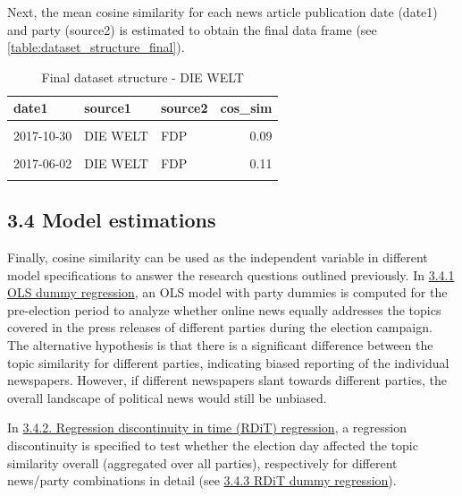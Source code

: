 \documentclass[
  12pt,
]{article}
\begin{document}
Next, the mean cosine similarity for each news article publication date
(date1) and party (source2) is estimated to obtain the final data frame
(see \autoref{table:dataset_structure_final}).

\begin{table}[H]

\caption{\label{tab:Dataset structure final}Final dataset structure - DIE WELT \label{table:dataset_structure_final}}
\centering
\fontsize{7}{9}\selectfont
\begin{tabular}[t]{lllr}
\toprule
date1 & source1 & source2 & cos\_sim\\
\midrule
\cellcolor{gray!6}{2018-01-25} & \cellcolor{gray!6}{DIE WELT} & \cellcolor{gray!6}{AfD} & \cellcolor{gray!6}{0.16}\\
2017-10-30 & DIE WELT & FDP & 0.09\\
\cellcolor{gray!6}{2017-12-18} & \cellcolor{gray!6}{DIE WELT} & \cellcolor{gray!6}{DIE LINKE} & \cellcolor{gray!6}{0.08}\\
2017-06-02 & DIE WELT & FDP & 0.11\\
\cellcolor{gray!6}{2018-02-08} & \cellcolor{gray!6}{DIE WELT} & \cellcolor{gray!6}{CDU} & \cellcolor{gray!6}{0.18}\\
\bottomrule
\end{tabular}
\end{table}

\hypertarget{model-estimations}{%
\subsection{3.4 Model estimations}\label{model-estimations}}

Finally, cosine similarity can be used as the independent variable in
different model specifications to answer the research questions outlined
previously. In \protect\hyperlink{ols-dummy-regression}{3.4.1 OLS dummy
regression}, an OLS model with party dummies is computed for the
pre-election period to analyze whether online news equally addresses the
topics covered in the press releases of different parties during the
election campaign. The alternative hypothesis is that there is a
significant difference between the topic similarity for different
parties, indicating biased reporting of the individual newspapers.
However, if different newspapers slant towards different parties, the
overall landscape of political news would still be unbiased.

In \protect\hyperlink{rdit}{3.4.2. Regression discontinuity in time
(RDiT) regression}, a regression discontinuity is specified to test
whether the election day affected the topic similarity overall
(aggregated over all parties), respectively for different news/party
combinations in detail (see \protect\hyperlink{rdit-dummy}{3.4.3 RDiT
dummy regression}).
\end{document}
